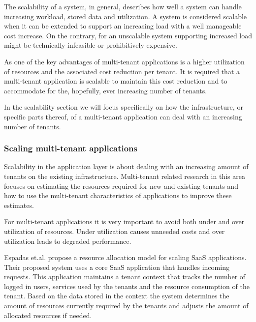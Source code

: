 The scalability of a system, in general, describes how well a system can handle increasing workload, stored data and utilization.
A system is considered scalable when it can be extended to support an increasing load with a well manageable cost increase.
On the contrary, for an unscalable system supporting increased load might be technically infeasible or prohibitively expensive.\cite{bondi2000scalability}

As one of the key advantages of multi-tenant applications is a higher utilization of resources and the associated cost reduction per tenant.\cite{bezemer2010multi} 
It is required that a multi-tenant application is scalable to maintain this cost reduction and to accommodate for the, hopefully, ever increasing number of tenants.

In the scalability section we will focus specifically on how the infrastructure, or specific parts thereof, of a multi-tenant application can deal with an increasing number of tenants.

\subsubsection{Scaling multi-tenant applications}
Scalability in the application layer is about dealing with an increasing amount of tenants on the existing infrastructure.
Multi-tenant related research in this area focuses on estimating the resources required for new and existing tenants and how to use the multi-tenant characteristics of applications to improve these estimates. 

For multi-tenant applications it is very important to avoid both under and over utilization of resources.
Under utilization causes unneeded costs and over utilization leads to degraded performance.

Espadas et.al. \cite{espadas2013tenant} propose a resource allocation model for scaling SaaS applications.
Their proposed system uses a core SaaS application that handles incoming requests.
This application maintains a tenant context that tracks the number of logged in users, services used by the tenants and the resource consumption of the tenant.
Based on the data stored in the context the system determines the amount of resources currently required by the tenants and adjusts the amount of allocated resources if needed.

